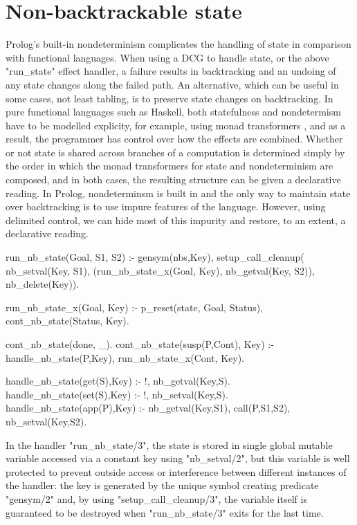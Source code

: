 \section{Non-backtrackable state}
Prolog's built-in nondeterminism complicates the handling of state in comparison
with functional languages. When using a DCG to handle state, or the above
"run_state" effect handler, a failure results in backtracking and an undoing of
any state changes along the failed path. An alternative, which can be useful in
some cases, not least tabling, is to preserve state changes on backtracking.
In pure functional languages such as Haskell, both statefulness and nondetermism
have to be modelled explicity, for example, using monad transformers
\cite{LiangHudakJones1995}, and as a result, the
programmer has control over how the effects are combined. Whether or not state is
shared across branches of a computation is determined simply by the order in which
the monad transformers for state and nondeterminism are composed, and in both cases,
the resulting structure can be given a declarative reading. In Prolog, nondeterminsm
is built in and the only way to maintain state over backtracking is to use
impure features of the language. However, using delimited control, we can hide most
of this impurity and restore, to an extent, a declarative reading.
\begin{prolog-framed}[name=ccstate]
  run_nb_state(Goal, S1, S2) :-
     gensym(nbs,Key),
     setup_call_cleanup( nb_setval(Key, S1),
                         (run_nb_state_x(Goal, Key), nb_getval(Key, S2)),
                         nb_delete(Key)).

  run_nb_state_x(Goal, Key) :-
     p_reset(state, Goal, Status),
     cont_nb_state(Status, Key).

  cont_nb_state(done, _).
  cont_nb_state(susp(P,Cont), Key) :-
     handle_nb_state(P,Key), run_nb_state_x(Cont, Key).

  handle_nb_state(get(S),Key) :- !, nb_getval(Key,S).
  handle_nb_state(set(S),Key) :- !, nb_setval(Key,S).
  handle_nb_state(app(P),Key) :- nb_getval(Key,S1), call(P,S1,S2),
                                 nb_setval(Key,S2).
\end{prolog-framed}
In the handler "run_nb_state/3", the state is stored in single global mutable variable
accessed via a constant key using "nb_setval/2", but this variable is well protected
to prevent outside access or interference between different instances of the handler:
the key is generated by the unique symbol creating predicate "gensym/2" and, by
using "setup_call_cleanup/3", the variable itself is guaranteed to be destroyed
when "run_nb_state/3" exits for the last time.

